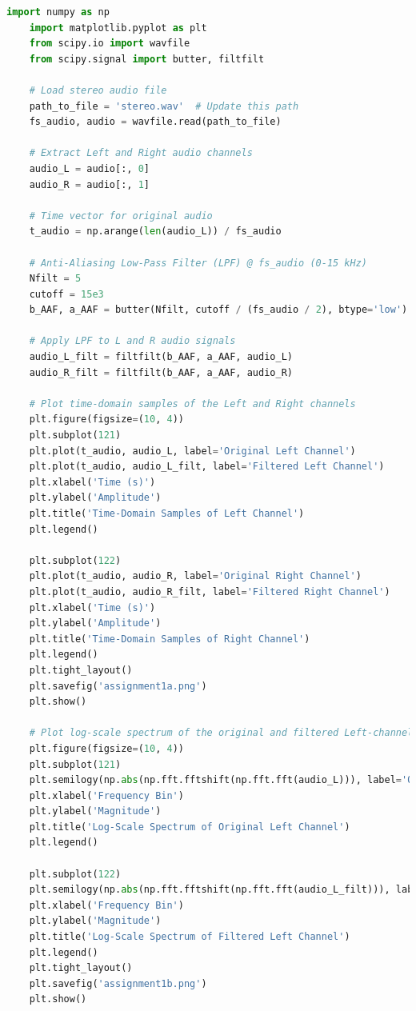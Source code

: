 \documentclass[
	letterpaper, %
	10pt, %
]{CSUniSchoolLabReport}
\begin{document}
\begin{lstlisting}[language=Python]
	import numpy as np
	import matplotlib.pyplot as plt
	from scipy.io import wavfile
	from scipy.signal import butter, filtfilt
	
	# Load stereo audio file
	path_to_file = 'stereo.wav'  # Update this path
	fs_audio, audio = wavfile.read(path_to_file)
	
	# Extract Left and Right audio channels
	audio_L = audio[:, 0]
	audio_R = audio[:, 1]
	
	# Time vector for original audio
	t_audio = np.arange(len(audio_L)) / fs_audio
	
	# Anti-Aliasing Low-Pass Filter (LPF) @ fs_audio (0-15 kHz)
	Nfilt = 5
	cutoff = 15e3
	b_AAF, a_AAF = butter(Nfilt, cutoff / (fs_audio / 2), btype='low')
	
	# Apply LPF to L and R audio signals
	audio_L_filt = filtfilt(b_AAF, a_AAF, audio_L)
	audio_R_filt = filtfilt(b_AAF, a_AAF, audio_R)
	
	# Plot time-domain samples of the Left and Right channels
	plt.figure(figsize=(10, 4))
	plt.subplot(121)
	plt.plot(t_audio, audio_L, label='Original Left Channel')
	plt.plot(t_audio, audio_L_filt, label='Filtered Left Channel')
	plt.xlabel('Time (s)')
	plt.ylabel('Amplitude')
	plt.title('Time-Domain Samples of Left Channel')
	plt.legend()
	
	plt.subplot(122)
	plt.plot(t_audio, audio_R, label='Original Right Channel')
	plt.plot(t_audio, audio_R_filt, label='Filtered Right Channel')
	plt.xlabel('Time (s)')
	plt.ylabel('Amplitude')
	plt.title('Time-Domain Samples of Right Channel')
	plt.legend()
	plt.tight_layout()
	plt.savefig('assignment1a.png')
	plt.show()
	
	# Plot log-scale spectrum of the original and filtered Left-channel audio
	plt.figure(figsize=(10, 4))
	plt.subplot(121)
	plt.semilogy(np.abs(np.fft.fftshift(np.fft.fft(audio_L))), label='Original Left Channel')
	plt.xlabel('Frequency Bin')
	plt.ylabel('Magnitude')
	plt.title('Log-Scale Spectrum of Original Left Channel')
	plt.legend()
	
	plt.subplot(122)
	plt.semilogy(np.abs(np.fft.fftshift(np.fft.fft(audio_L_filt))), label='Filtered Left Channel')
	plt.xlabel('Frequency Bin')
	plt.ylabel('Magnitude')
	plt.title('Log-Scale Spectrum of Filtered Left Channel')
	plt.legend()
	plt.tight_layout()
	plt.savefig('assignment1b.png')
	plt.show()
	
\end{lstlisting}
\end{document}
